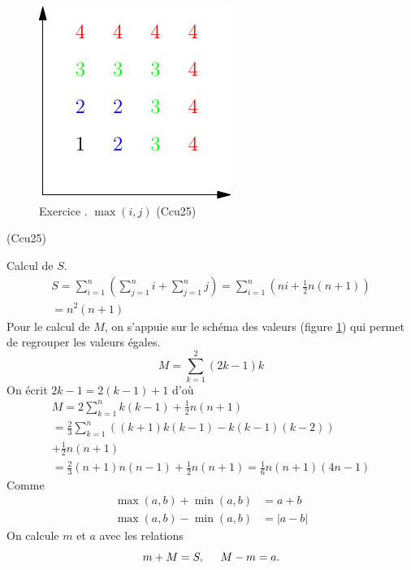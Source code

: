 \begin{figure}
 \centering
 \includegraphics{./Ccu25_1.pdf}
 \caption{Exercice \theenumi. \; $\max(i,j)$ \tiny{ (Ccu25)}}
 \label{fig:Ccu25_1}
\end{figure}

\begin{tiny}(Ccu25)\end{tiny} Calcul de $S$.
\begin{multline*}
 S = \sum_{i=1}^n \left( \sum_{j=1}^n i + \sum_{j=1}^n j\right) 
 = \sum_{i=1}^n \left( n i + \frac{1}{2}n(n+1)\right) \\
 = n^2(n+1)
\end{multline*}
Pour le calcul de $M$, on s'appuie sur le schéma des valeurs (figure \ref{fig:Ccu25_1}) qui permet de regrouper les valeurs égales.
\begin{displaymath}
 M =
 \sum_{k=1}^2(2k-1)k
\end{displaymath}
On écrit $2k-1=2(k-1)+1$ d'où
\begin{multline*}
 M = 
2\sum_{k=1}^{n}k(k-1) +\frac{1}{2}n(n+1) \\
= \frac{2}{3}\sum_{k=1}^n\left( (k+1)k(k-1) - k(k-1)(k-2)\right) \\
+ \frac{1}{2}n(n+1)\\
= \frac{2}{3}(n+1)n(n-1) + \frac{1}{2}n(n+1)
= \frac{1}{6}n(n+1)(4n-1)
\end{multline*}
Comme
\begin{align*}
 \max(a,b) + \min(a,b) &= a+b\\
 \max(a,b) - \min(a,b) &= |a-b|
\end{align*}
On calcule $m$ et $a$ avec les relations
\begin{displaymath}
 m + M = S,\hspace{0.5cm} M - m = a.
\end{displaymath}


